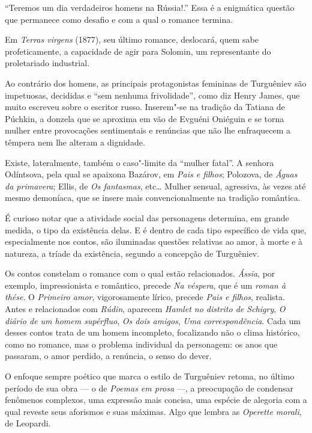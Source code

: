 ``Teremos um dia verdadeiros homens na Rússia!.'' Essa é a enigmática
questão que permanece como desafio e com a qual o romance termina.

Em \emph{Terras virgens} (1877), seu último romance, deslocará, quem
sabe profeticamente, a capacidade de agir para Solomin, um representante
do proletariado industrial.

Ao contrário dos homens, as principais protagonistas femininas de
Turguêniev são impetuosas, decididas e ``sem nenhuma frivolidade'', como
diz Henry James, que muito escreveu sobre o escritor russo. Inserem"-se
na tradição da Tatiana de Púchkin, a donzela que se aproxima em vão de Evguéni Oniéguin e se
torna mulher entre provocações sentimentais e renúncias que não lhe
enfraquecem a têmpera nem lhe alteram a dignidade.

Existe, lateralmente, também o caso"-limite da ``mulher fatal''. A
senhora Odíntsova, pela qual se apaixona Bazárov, em \emph{Pais e filhos}; Polozova, de
\emph{Águas da primavera}; Ellis, de \emph{Os fantasmas}, etc\ldots{} Mulher
sensual, agressiva, às vezes até mesmo demoníaca, que se insere mais
convencionalmente na tradição romântica.

É curioso notar que a atividade social das personagens determina, em grande
medida, o tipo da existência delas. E é dentro de cada tipo
específico de vida que, especialmente nos contos, são iluminadas
questões relativas ao amor, à morte e à natureza, a tríade da
existência, segundo a concepção de Turguêniev.

Os contos constelam o romance com o qual estão relacionados.
\emph{Ássia}, por exemplo, impressionista e romântico, precede \emph{Na
véspera}, que é um \emph{roman à thése}. O \emph{Primeiro amor},
vigorosamente lírico, precede \emph{Pais e filhos}, realista. Antes e relacionados
com \emph{Rúdin}, aparecem \emph{Hamlet no distrito de Schigry}, \emph{O
diário de um homem supérfluo}, \emph{Os dois amigos}, \emph{Uma
correspondência}. Cada um desses contos trata de um homem incompleto,
focalizando não o clima histórico, como no romance, mas o problema
individual da personagem: os anos que passaram, o amor perdido, a
renúncia, o senso do dever.

O enfoque sempre poético que marca o estilo de Turguêniev retoma, no
último período de sua obra --- o de \emph{Poemas em prosa} ---, a
preocupação de condensar fenômenos complexos, uma expressão mais
concisa, uma espécie de alegoria com a qual reveste seus aforismos e
suas máximas. Algo que lembra as \emph{Operette morali}, de Leopardi.

